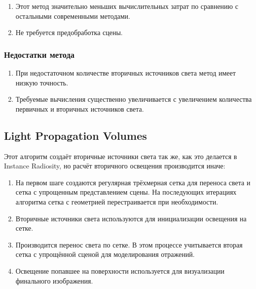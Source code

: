 \documentclass[12pt,fleqn]{article}
\begin{document}
\begin{enumerate}

\item Этот метод значительно меньших вычислительных затрат по сравнению с остальными современными методами.

\item Не требуется предобработка сцены.

\end{enumerate}

\subsubsection{Недостатки метода}

\begin{enumerate}

\item При недостаточном количестве вторичных источников света метод имеет низкую точность.

\item Требуемые вычисления существенно увеличивается с увеличением количества первичных и вторичных источников света.

\end{enumerate}

\subsection{Light Propagation Volumes}

Этот алгоритм \cite{LightPropagationVolumes} создаёт вторичные источники света так же, как это делается в Instance Radiosity, но расчёт вторичного освещения производится иначе:

\begin{enumerate}

\item На первом шаге создаются регулярная трёхмерная сетка для переноса света и сетка с упрощенным представлением сцены. На последующих итерациях алгоритма сетка с геометрией перестраивается при необходимости.

\item Вторичные источники света используются для инициализации освещения на сетке.

\item Производится перенос света по сетке. В этом процессе учитывается вторая сетка с упрощённой сценой для моделирования отражений.

\item Освещение попавшее на поверхности используется для визуализации финального изображения.

\end{enumerate}
\end{document}
